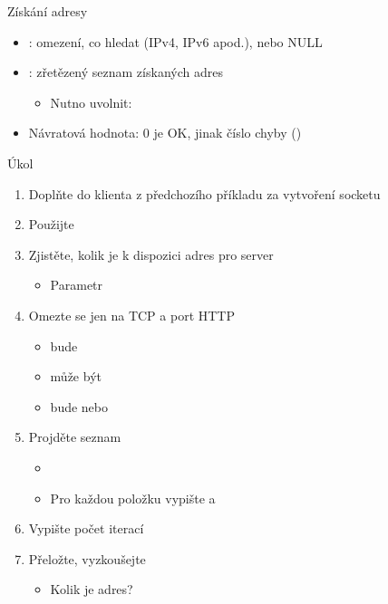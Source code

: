 \begin{frame}[fragile]{Získání adresy}
\begin{itemize}
    \pause

    \item {}: omezení, co hledat (IPv4, IPv6 apod.), nebo NULL

    \pause

    \item {}: zřetězený seznam získaných adres
    \begin{itemize}
      \item Nutno uvolnit: 
    \end{itemize}

    \pause

    \item Návratová hodnota: 0 je OK, jinak číslo chyby ()
  \end{itemize}

\end{frame}

\begin{frame}{Úkol}

  \begin{enumerate}
    \item Doplňte do klienta z předchozího příkladu za vytvoření socketu
    \item Použijte 

    \item Zjistěte, kolik je k dispozici adres pro server 
    \begin{itemize}
      \item Parametr 
    \end{itemize}

    \item Omezte se jen na TCP a port HTTP
    \begin{itemize}
      \item {} bude 
      \item {} může být 
      \item {} bude  nebo 
    \end{itemize}

    \item Projděte seznam
    \begin{itemize}
      \item {}
      \item Pro každou položku vypište  a 
    \end{itemize}

    \item Vypište počet iterací

    \item Přeložte, vyzkoušejte
    \begin{itemize}
      \item Kolik je adres?
    \end{itemize}
  \end{enumerate}

\end{frame}

